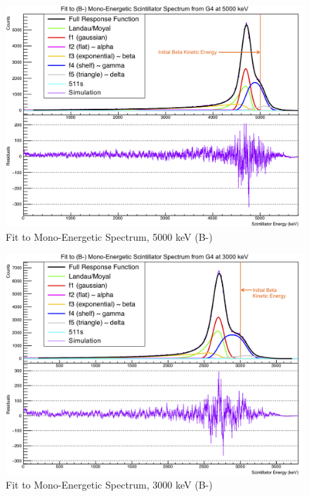 \begin{figure}[htb]
	\centering
	\includegraphics[width=.999\linewidth]
	{Figures/MonoFit_5000.png}
	\caption[Fit to Mono-Energetic Spectrum, 5000 keV]{Fit to Mono-Energetic Spectrum, 5000 keV (B-)}	
	\label{fig:lineshape_5000}
\end{figure}
\begin{figure}[h!!tb]
	\centering
	\includegraphics[width=.999\linewidth]
	{Figures/MonoFit_3000.png}
	\caption[Fit to Mono-Energetic Spectrum, 3000 keV]{Fit to Mono-Energetic Spectrum, 3000 keV (B-)}	
	\label{fig:lineshape_3000}
\end{figure}
